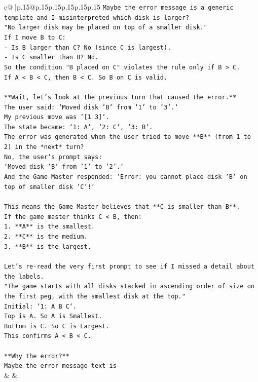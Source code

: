 \documentclass{article}
\begin{document}
{\begin{supertabular}{c@{$\;$}|p{.15\linewidth}@{}p{.15\linewidth}p{.15\linewidth}p{.15\linewidth}p{.15\linewidth}p{.15\linewidth}}
{{{\texttt{Maybe the error message is a generic template and I misinterpreted which disk is larger?} \\
\texttt{"No larger disk may be placed on top of a smaller disk."} \\
\texttt{If I move B to C:} \\
\texttt{{-} Is B larger than C? No (since C is largest).} \\
\texttt{{-} Is C smaller than B? No.} \\
\texttt{So the condition "B placed on C" violates the rule only if B > C.} \\
\texttt{If A < B < C, then B < C. So B on C is valid.} \\
\\ 
\texttt{**Wait, let's look at the previous turn that caused the error.**} \\
\texttt{The user said: `Moved disk 'B' from '1' to '3'.`} \\
\texttt{My previous move was `{[}1 3{]}`.} \\
\texttt{The state became: `1: A`, `2: C`, `3: B`.} \\
\texttt{The error was generated when the user tried to move **B** (from 1 to 2) in the *next* turn?} \\
\texttt{No, the user's prompt says:} \\
\texttt{`Moved disk 'B' from '1' to '2'.`} \\
\texttt{And the Game Master responded: `Error: you cannot place disk 'B' on top of smaller disk 'C'!`} \\
\\ 
\texttt{This means the Game Master believes that **C is smaller than B**.} \\
\texttt{If the game master thinks C < B, then:} \\
\texttt{1.  **A** is the smallest.} \\
\texttt{2.  **C** is the medium.} \\
\texttt{3.  **B** is the largest.} \\
\\ 
\texttt{Let's re{-}read the very first prompt to see if I missed a detail about the labels.} \\
\texttt{"The game starts with all disks stacked in ascending order of size on the first peg, with the smallest disk at the top."} \\
\texttt{Initial: `1: A B C`.} \\
\texttt{Top is A. So A is Smallest.} \\
\texttt{Bottom is C. So C is Largest.} \\
\texttt{This confirms A < B < C.} \\
\\ 
\texttt{**Why the error?**} \\
\texttt{Maybe the error message text is} \\
            }
        }
    }
    & & \\ \\


\end{supertabular}}
\end{document}
